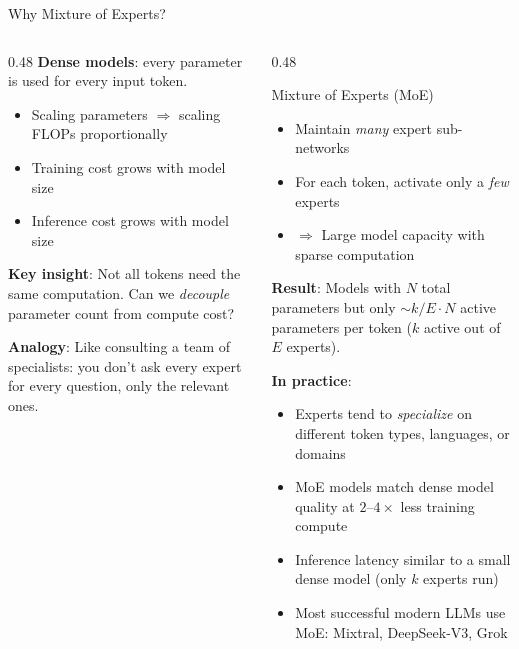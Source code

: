 \begin{frame}{Why Mixture of Experts?}

  \begin{columns}
    \begin{column}{0.48\textwidth}
      \textbf{Dense models}: every parameter is used for every input token.
      \begin{itemize}
        \item Scaling parameters $\Rightarrow$ scaling FLOPs proportionally
        \item Training cost grows with model size
        \item Inference cost grows with model size
      \end{itemize}

      \vspace{0.5em}
      \textbf{Key insight}: Not all tokens need the same computation. Can we \emph{decouple} parameter count from compute cost?

      \vspace{0.5em}
      \textbf{Analogy}: Like consulting a team of specialists: you don't ask every expert for every question, only the relevant ones.
    \end{column}
    \begin{column}{0.48\textwidth}
      \begin{alertblock}{Mixture of Experts (MoE)}
        \begin{itemize}
          \item Maintain \emph{many} expert sub-networks
          \item For each token, activate only a \emph{few} experts
          \item $\Rightarrow$ Large model capacity with sparse computation
        \end{itemize}
      \end{alertblock}

      \vspace{0.3em}
      \textbf{Result}: Models with $N$ total parameters but only $\sim k/E \cdot N$ active parameters per token ($k$ active out of $E$ experts).

      \vspace{0.3em}
      \textbf{In practice}:
      \begin{itemize}
        \item Experts tend to \emph{specialize} on different token types, languages, or domains
        \item MoE models match dense model quality at $2$--$4\times$ less training compute
        \item Inference latency similar to a small dense model (only $k$ experts run)
        \item Most successful modern LLMs use MoE: Mixtral, DeepSeek-V3, Grok
      \end{itemize}
    \end{column}
  \end{columns}
\end{frame}

